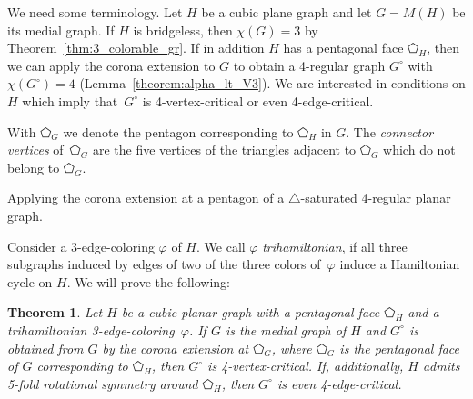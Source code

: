 \documentclass[fontsize=11pt,a4paper,DIV12]{scrartcl}
\newtheorem{theorem}{Theorem}
\def\GC{\ensuremath{G^\circ}}
\begin{document}
We need some terminology.  
Let $H$ be a cubic plane graph and let $G=M(H)$ be its medial graph.  If $H$ is
bridgeless, then $\chi(G)=3$ by Theorem~\ref{thm:3_colorable_gr}.  If in addition $H$ has
a pentagonal face $\pentagon_H$, then we can apply the corona extension to $G$ to obtain
a 4-regular graph $G^\circ$ with
$\chi(G^\circ)=4$ (Lemma~\ref{theorem:alpha_lt_V3}).  We are interested in conditions on $H$ which imply that~$G^\circ$ is 4-vertex-critical or even 4-edge-critical. 

With $\pentagon_G$ we denote the pentagon corresponding to $\pentagon_H$ in $G$. The \emph{connector
  vertices} of~$\pentagon_G$ are the five
vertices of the triangles adjacent to $\pentagon_G$ which do not belong to $\pentagon_G$. 


{Applying the corona extension at a pentagon of a $\triangle$-saturated 4-regular planar graph.  }



Consider a 3-edge-coloring $\varphi$ of $H$. 
We call $\varphi$ \emph{trihamiltonian}, if all three subgraphs induced by edges of two of the three colors of~$\varphi$ induce a Hamiltonian cycle on $H$. We will prove the following:


\begin{theorem}\label{thm:ve-critical}
  Let $H$ be a cubic planar graph with a pentagonal face $\pentagon_H$ 
  and a trihamiltonian 3-edge-coloring~$\varphi$.  
  If $G$ is the medial graph of $H$ and $\GC$
  is obtained from $G$ by the corona extension at $\pentagon_G$, 
  where $\pentagon_G$ is the pentagonal face of $G$ corresponding to $\pentagon_H$, then $G^\circ$ is 4-vertex-critical. 
  If, additionally, $H$ admits 5-fold rotational symmetry around $\pentagon_H$, 
  then $G^\circ$ is even 4-edge-critical.
\end{theorem}
\end{document}
